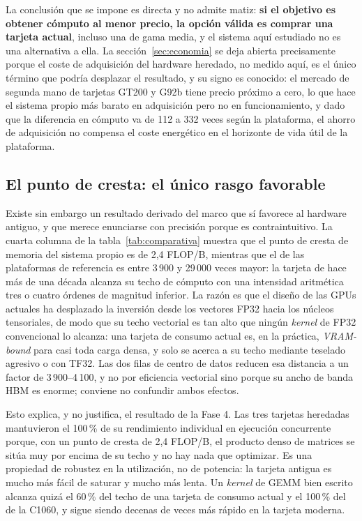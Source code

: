 \documentclass[a4paper,11pt]{article}
\begin{document}
La conclusión que se impone es directa y no admite matiz: \textbf{si el objetivo es obtener cómputo al menor precio, la opción
válida es comprar una tarjeta actual}, incluso una de gama media, y el sistema aquí estudiado no es una alternativa a ella. La
sección~\ref{sec:economia} se deja abierta precisamente porque el coste de adquisición del hardware heredado, no medido aquí,
es el único término que podría desplazar el resultado, y su signo es conocido: el mercado de segunda mano de tarjetas GT200 y
G92b tiene precio próximo a cero, lo que hace el sistema propio más barato en adquisición pero no en funcionamiento, y dado que
la diferencia en cómputo va de 112 a 332 veces según la plataforma, el ahorro de adquisición no compensa el coste energético en el
horizonte de vida útil de la plataforma.

\subsection*{El punto de cresta: el único rasgo favorable}

Existe sin embargo un resultado derivado del marco que sí favorece al hardware antiguo, y que merece enunciarse con precisión
porque es contraintuitivo. La cuarta columna de la tabla~\ref{tab:comparativa} muestra que el punto de cresta de memoria del
sistema propio es de 2,4 FLOP/B, mientras que el de las plataformas de referencia es entre 3\,900 y 29\,000 veces mayor: la
tarjeta de hace más de una década alcanza su techo de cómputo con una intensidad aritmética tres o cuatro órdenes de magnitud
inferior. La razón es que el diseño de las GPUs actuales ha desplazado la inversión desde los vectores FP32 hacia los núcleos
tensoriales, de modo que su techo vectorial es tan alto que ningún \textit{kernel} de FP32 convencional lo alcanza: una tarjeta
de consumo actual es, en la práctica, \emph{VRAM-bound} para casi toda carga densa, y solo se acerca a su techo mediante
teselado agresivo o con TF32. Las dos filas de centro de datos reducen esa distancia a un factor de 3\,900--4\,100, y no por
eficiencia vectorial sino porque su ancho de banda HBM es enorme; conviene no confundir ambos efectos.

Esto explica, y no justifica, el resultado de la Fase 4. Las tres tarjetas heredadas mantuvieron el 100\,\% de su rendimiento
individual en ejecución concurrente porque, con un punto de cresta de 2,4 FLOP/B, el producto denso de matrices se sitúa muy por
encima de su techo y no hay nada que optimizar. Es una propiedad de robustez en la utilización, no de potencia: la tarjeta antigua
es mucho más fácil de saturar y mucho más lenta. Un \textit{kernel} de GEMM bien escrito alcanza quizá el 60\,\% del techo de una
tarjeta de consumo actual y el 100\,\% del de la C1060, y sigue siendo decenas de veces más rápido en la tarjeta moderna.
\end{document}
